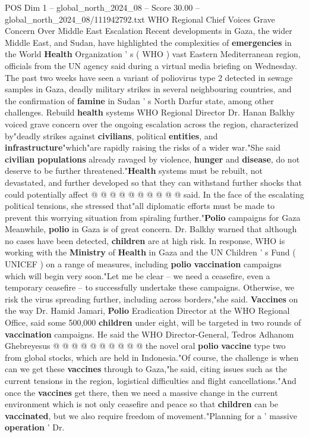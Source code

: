\begin{textsample}{POS Dim 1 – global\_north\_2024\_08 – Score 30.00 – global\_north\_2024\_08/111942792.txt}  \label{ex:f1_pos_406}
WHO Regional Chief Voices Grave Concern Over Middle East Escalation Recent developments in Gaza, the wider Middle East, and Sudan, have highlighted the complexities of \textbf{emergencies} in the World \textbf{Health} Organization ' s ( WHO ) vast Eastern Mediterranean region, officials from the UN agency said during a virtual media briefing on Wednesday.
The past two weeks have seen a variant of poliovirus type 2 detected in sewage samples in Gaza, deadly military strikes in several neighbouring countries, and the confirmation of \textbf{famine} in Sudan ' s North Darfur state, among other challenges.
Rebuild \textbf{health} systems WHO Regional Director Dr.
Hanan Balkhy voiced grave concern over the ongoing escalation across the region, characterized by"deadly strikes against \textbf{civilians}, political \textbf{entities}, and \textbf{infrastructure}"which"are rapidly raising the risks of a wider war."She said \textbf{civilian} \textbf{populations} already ravaged by violence, \textbf{hunger} and \textbf{disease}, do not deserve to be further threatened."\textbf{Health} systems must be rebuilt, not devastated, and further developed so that they can withstand further shocks that could potentially affect @ @ @ @ @ @ @ @ @ @ said.
In the face of the escalating political tensions, she stressed that"all diplomatic efforts must be made to prevent this worrying situation from spiraling further."\textbf{Polio} campaigns for Gaza Meanwhile, \textbf{polio} in Gaza is of great concern.
Dr.
Balkhy warned that although no cases have been detected, \textbf{children} are at high risk.
In response, WHO is working with the \textbf{Ministry} of \textbf{Health} in Gaza and the UN Children ' s Fund ( UNICEF ) on a range of measures, including \textbf{polio} \textbf{vaccination} campaigns which will begin very soon."Let me be clear -- we need a ceasefire, even a temporary ceasefire -- to successfully undertake these campaigns.
Otherwise, we risk the virus spreading further, including across borders,"she said. \textbf{Vaccines} on the way Dr.
Hamid Jamari, \textbf{Polio} Eradication Director at the WHO Regional Office, said some 500,000 \textbf{children} under eight, will be targeted in two rounds of \textbf{vaccination} campaigns.
He said the WHO Director-General, Tedros Adhanom Ghebreyesus @ @ @ @ @ @ @ @ @ @ the novel oral \textbf{polio} \textbf{vaccine} type two from global stocks, which are held in Indonesia."Of course, the challenge is when can we get these \textbf{vaccines} through to Gaza,"he said, citing issues such as the current tensions in the region, logistical difficulties and flight cancellations."And once the \textbf{vaccines} get there, then we need a massive change in the current environment which is not only ceasefire and peace so that \textbf{children} can be \textbf{vaccinated}, but we also require freedom of movement."Planning for a ' massive \textbf{operation} ' Dr.

\end{textsample}
